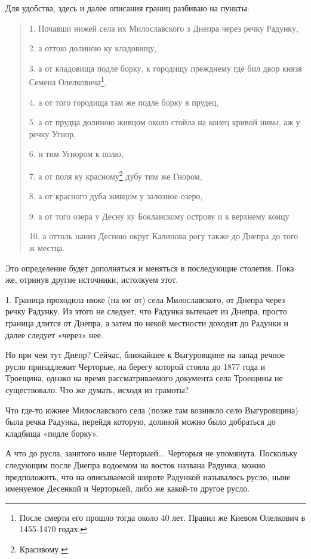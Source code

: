 Для удобства, здесь и далее описания границ разбиваю на пункты:

\begin{quotation}
1. Почавши нижей села их Милославского з Днепра через речку Радунку,

2. а оттою долиною ку кладовищу,

3. а от кладовища подле борку, к городищу прежднему где бил двор князя Семена Олелковича\footnote{После смерти его прошло тогда около 40 лет. Правил же Киевом Олелкович в 1455-1470 годах.}, 

4. а от того городища там же подле борку в прудец,

5. а от прудца долиною живцом около стойла на конец кривой нивы, аж у речку Угнор,

6. и тим Угнором к полю,

7. а от поля ку красному\footnote{Красивому.} дубу тим же Гнором,

8. а от красного дуба живцом у залозное озеро,

9. а от того озера у Десну ку Бокланскому острову и к верхнему концу

10. а оттоль наниз Десною округ Калинова рогу также до Днепра до того ж местца.
\end{quotation}

Это определение будет дополняться и меняться в последующие столетия. Пока же, отринув другие источники, истолкуем этот.

1. Граница проходила ниже (на юг от) села Милославского, от Днепра через речку Радунку. Из этого не следует, что Радунка вытекает из Днепра, просто граница длится от Днепра, а затем по некой местности доходит до Радунки и далее следует «через» нее.

Но при чем тут Днепр? Сейчас, ближайшее к Выгуровщине на запад речное русло принадлежит Черторые, на берегу которой стояла до 1877 года и Троещина, однако на время рассматриваемого документа села Троещины не существовало. Что же думать, исходя из грамоты?

Что где-то южнее Милославского села (позже там возникло село Выгуровщина) была речка Радунка, перейдя которую, долиной можно было добраться до кладбища «подле борку».

А что до русла, занятого ныне Черторыей... Черторыя не упомянута. Поскольку следующим после Днепра водоемом на восток названа Радунка, можно предположить, что на описываемой широте Радункой называлось русло, ныне именуемое Десенкой и Черторыей, либо же какой-то другое русло.

